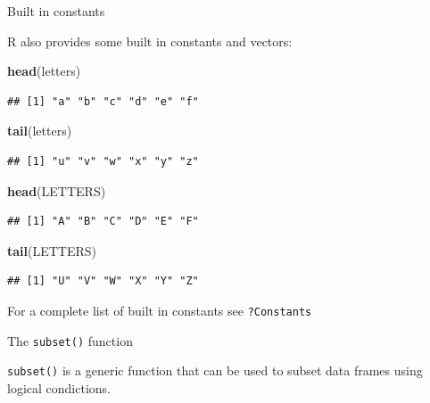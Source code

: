 \documentclass[ignorenonframetext,]{beamer}
\newenvironment{Shaded}{\begin{snugshade}}{\end{snugshade}}
\newcommand{\KeywordTok}[1]{\textcolor[rgb]{0.13,0.29,0.53}{\textbf{#1}}}
\newcommand{\NormalTok}[1]{#1}
\begin{document}
\begin{frame}[fragile]{Built in constants}
\protect\hypertarget{built-in-constants}{}

R also provides some built in constants and vectors:

\begin{Shaded}
\begin{Highlighting}[]
\KeywordTok{head}\NormalTok{(letters)}
\end{Highlighting}
\end{Shaded}

\begin{verbatim}
## [1] "a" "b" "c" "d" "e" "f"
\end{verbatim}

\begin{Shaded}
\begin{Highlighting}[]
\KeywordTok{tail}\NormalTok{(letters)}
\end{Highlighting}
\end{Shaded}

\begin{verbatim}
## [1] "u" "v" "w" "x" "y" "z"
\end{verbatim}

\begin{Shaded}
\begin{Highlighting}[]
\KeywordTok{head}\NormalTok{(LETTERS)}
\end{Highlighting}
\end{Shaded}

\begin{verbatim}
## [1] "A" "B" "C" "D" "E" "F"
\end{verbatim}

\begin{Shaded}
\begin{Highlighting}[]
\KeywordTok{tail}\NormalTok{(LETTERS)}
\end{Highlighting}
\end{Shaded}

\begin{verbatim}
## [1] "U" "V" "W" "X" "Y" "Z"
\end{verbatim}

For a complete list of built in constants see \texttt{?Constants}

\end{frame}

\begin{frame}[fragile]{The \texttt{subset()} function}
\protect\hypertarget{the-subset-function}{}

\texttt{subset()} is a generic function that can be used to subset data
frames using logical condictions.

\end{frame}
\end{document}
